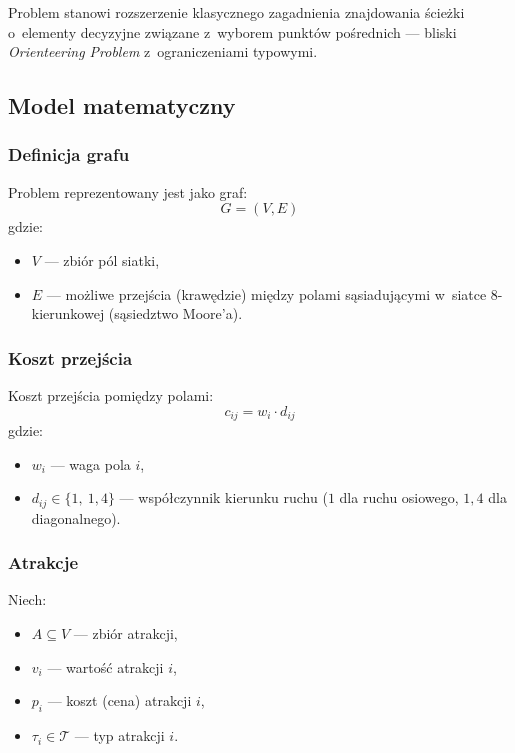 Problem stanowi rozszerzenie klasycznego zagadnienia znajdowania ścieżki
o~elementy decyzyjne związane z~wyborem punktów pośrednich --- bliski
\emph{Orienteering Problem} z~ograniczeniami typowymi.

\subsection{Model matematyczny}
\label{sec:model}

\subsubsection{Definicja grafu}

Problem reprezentowany jest jako graf:
\[
G = (V, E)
\]
gdzie:
\begin{itemize}
    \item $V$ --- zbiór pól siatki,
    \item $E$ --- możliwe przejścia (krawędzie) między polami sąsiadującymi
          w~siatce 8-kierunkowej (sąsiedztwo Moore'a).
\end{itemize}

\subsubsection{Koszt przejścia}

Koszt przejścia pomiędzy polami:
\[
c_{ij} = w_i \cdot d_{ij}
\]
gdzie:
\begin{itemize}
    \item $w_i$ --- waga pola $i$,
    \item $d_{ij} \in \{1,\ 1{,}4\}$ --- współczynnik kierunku ruchu
          ($1$ dla ruchu osiowego, $1{,}4$ dla diagonalnego).
\end{itemize}

\subsubsection{Atrakcje}

Niech:
\begin{itemize}
    \item $A \subseteq V$ --- zbiór atrakcji,
    \item $v_i$ --- wartość atrakcji $i$,
    \item $p_i$ --- koszt (cena) atrakcji $i$,
    \item $\tau_i \in \mathcal{T}$ --- typ atrakcji $i$.
\end{itemize}

